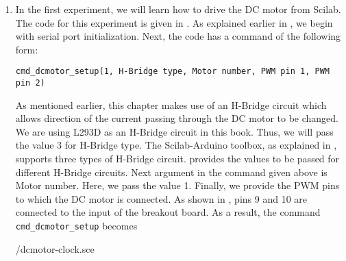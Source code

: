 \begin{enumerate}
  \item In the first experiment, we will learn how to drive the DC motor
        from Scilab. The code for this experiment is 
        given in  . As explained earlier in , 
        we begin with serial port initialization. 
        Next, the code has a command of the following form: 
        \begin{lstlisting}[style=nonumbers]
              cmd_dcmotor_setup(1, H-Bridge type, Motor number, PWM pin 1, PWM pin 2)
        \end{lstlisting}
        As mentioned earlier, this chapter makes use of an H-Bridge circuit which 
        allows direction of the current passing through the DC motor to be changed.
        We are using L293D as an H-Bridge circuit in this book. Thus, we will pass the value 3 for
        H-Bridge type. The Scilab-Arduino toolbox, as explained in , 
        supports three types of H-Bridge circuit. 
        provides the values to be passed for different H-Bridge circuits. 
        Next argument in the command given above is Motor number. Here, we pass the value 1. 
        Finally, we provide the PWM pins to which the DC motor is connected. As 
        shown in , pins 9 and 10 are connected to the
        input of the breakout board. As a result, the command {\tt cmd\_dcmotor\_setup} becomes
        
        {\LocDCMscicode/dcmotor-clock.sce}
        
        

\end{enumerate}
